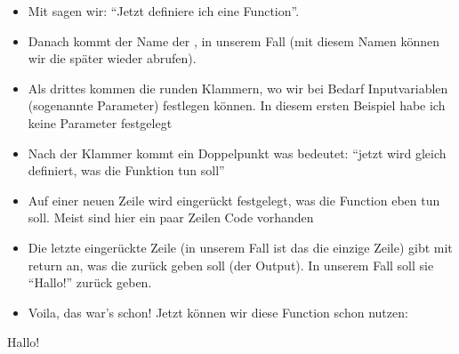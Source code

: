 \documentclass[letterpaper,10pt,english]{sphinxmanual}
\begin{document}
\begin{sphinxVerbatim}[commandchars=\\\{\}]
 
\end{sphinxVerbatim}
\begin{itemize}
\item {} 
Mit  sagen wir: “Jetzt definiere ich eine Function”.

\item {} 
Danach kommt der Name der , in unserem Fall  (mit diesem Namen können wir die  später wieder abrufen).

\item {} 
Als drittes kommen die runden Klammern, wo wir bei Bedarf Inputvariablen (sogenannte Parameter) festlegen können. In diesem ersten Beispiel habe ich keine Parameter festgelegt

\item {} 
Nach der Klammer kommt ein Doppelpunkt was bedeutet: “jetzt wird gleich definiert, was die Funktion tun soll”

\item {} 
Auf einer neuen Zeile wird eingerückt festgelegt, was die Function eben tun soll. Meist sind hier ein paar Zeilen Code vorhanden

\item {} 
Die letzte eingerückte Zeile (in unserem Fall ist das die einzige Zeile) gibt mit return an, was die  zurück geben soll (der Output). In unserem Fall soll sie “Hallo!”  zurück geben.

\item {} 
Voila, das war’s schon! Jetzt können wir diese Function schon nutzen:

\end{itemize}

\begin{sphinxVerbatim}[commandchars=\\\{\}]
\end{sphinxVerbatim}

\begin{sphinxVerbatim}[commandchars=\\\{\}]
\PYGZsq{}Hallo!\PYGZsq{}
\end{sphinxVerbatim}
\end{document}
